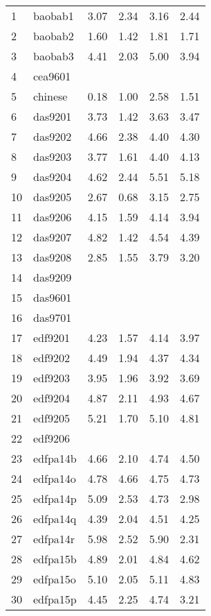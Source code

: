 \begin{longtable}{@{}llrrrr@{}}
1  & baobab1   & 3.07 & 2.34 & 3.16 & 2.44 \\
2  & baobab2   & 1.60 & 1.42 & 1.81 & 1.71 \\
3  & baobab3   & 4.41 & 2.03 & 5.00 & 3.94 \\
4  & cea9601   &      &      &      &      \\
5  & chinese   & 0.18 & 1.00 & 2.58 & 1.51 \\
6  & das9201   & 3.73 & 1.42 & 3.63 & 3.47 \\
7  & das9202   & 4.66 & 2.38 & 4.40 & 4.30 \\
8  & das9203   & 3.77 & 1.61 & 4.40 & 4.13 \\
9  & das9204   & 4.62 & 2.44 & 5.51 & 5.18 \\
10 & das9205   & 2.67 & 0.68 & 3.15 & 2.75 \\
11 & das9206   & 4.15 & 1.59 & 4.14 & 3.94 \\
12 & das9207   & 4.82 & 1.42 & 4.54 & 4.39 \\
13 & das9208   & 2.85 & 1.55 & 3.79 & 3.20 \\
14 & das9209   &      &      &      &      \\
15 & das9601   &      &      &      &      \\
16 & das9701   &      &      &      &      \\
17 & edf9201   & 4.23 & 1.57 & 4.14 & 3.97 \\
18 & edf9202   & 4.49 & 1.94 & 4.37 & 4.34 \\
19 & edf9203   & 3.95 & 1.96 & 3.92 & 3.69 \\
20 & edf9204   & 4.87 & 2.11 & 4.93 & 4.67 \\
21 & edf9205   & 5.21 & 1.70 & 5.10 & 4.81 \\
22 & edf9206   &      &      &      &      \\
23 & edfpa14b  & 4.66 & 2.10 & 4.74 & 4.50 \\
24 & edfpa14o  & 4.78 & 4.66 & 4.75 & 4.73 \\
25 & edfpa14p  & 5.09 & 2.53 & 4.73 & 2.98 \\
26 & edfpa14q  & 4.39 & 2.04 & 4.51 & 4.25 \\
27 & edfpa14r  & 5.98 & 2.52 & 5.90 & 2.31 \\
28 & edfpa15b  & 4.89 & 2.01 & 4.84 & 4.62 \\
29 & edfpa15o  & 5.10 & 2.05 & 5.11 & 4.83 \\
30 & edfpa15p  & 4.45 & 2.25 & 4.74 & 3.21 \\

\end{longtable}
